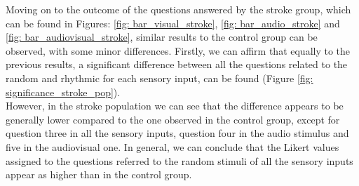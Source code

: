 Moving on to the outcome of the questions answered by the stroke group, which can be found in Figures: \ref{fig: bar_visual_stroke}, \ref{fig: bar_audio_stroke} and \ref{fig: bar_audiovisual_stroke}, similar results to the control group can be observed, with some minor differences. Firstly, we can affirm that equally to the previous results, a significant difference between all the questions related to the random and rhythmic for each sensory input, can be found (Figure \ref{fig: significance_stroke_pop}). \\ However, in the stroke population we can see that the difference appears to be generally lower compared to the one observed in the control group, except for question three in all the sensory inputs, question four in the audio stimulus and five in the audiovisual one. In general, we can conclude that the Likert values assigned to the questions referred to the random stimuli of all the sensory inputs appear as higher than in the control group.
